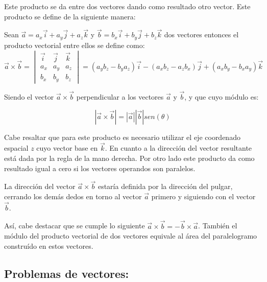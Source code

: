 Este producto se da entre dos vectores dando como resultado otro vector. Este producto se define de la siguiente manera:

\begin{tcolorbox}
 Sean $\vec{a} =a_x\vec{i}+a_y\vec{j}+a_z\vec{k}$ y $\vec{b}=b_x\vec{i}+b_y\vec{j}+b_z\vec{k}$ dos vectores entonces el 
 producto vectorial entre ellos se define como: 
\scriptsize{ 
 \[
\vec{a}\times\vec{b} =
\begin{vmatrix}
\vec{i} & \vec{j} & \vec{k} \\ 
a_x & a_y & a_z \\
b_x & b_y & b_z
\end{vmatrix} = (a_yb_z-b_ya_z)\vec{i}-(a_xb_z-a_zb_x)\vec{j}+(a_xb_y-b_xa_y)\vec{k}
\]}
\end{tcolorbox}

Siendo el vector $\vec{a}\times\vec{b}$ perpendicular a los vectores $\vec{a}$ y $\vec{b}$, y que cuyo módulo es:

\begin{equation}
 |\vec{a}\times\vec{b}|=|\vec{a}||\vec{b}|sen(\theta)
\end{equation}

Cabe resaltar que para este producto es necesario utilizar el eje coordenado espacial $z$ cuyo vector base en 
$\vec{k}$. En cuanto a la dirección del vector resultante está dada por la regla de la mano derecha. Por otro lado este 
producto da como resultado igual a cero si los vectores operandos son paralelos.

\begin{tcolorbox}
La dirección del vector $\vec{a}\times\vec{b}$ estaría definida por la dirección del pulgar, cerrando los demás dedos en torno al 
vector $\vec{a}$ primero y siguiendo con el vector $\vec{b}$.
\end{tcolorbox}

Así, cabe destacar que se cumple lo siguiente $\vec{a}\times\vec{b}=-\vec{b}\times\vec{a}$. También el módulo del producto 
vectorial de dos vectores equivale al área del paralelogramo construído en estos vectores.

\subsection{Problemas de vectores:}

